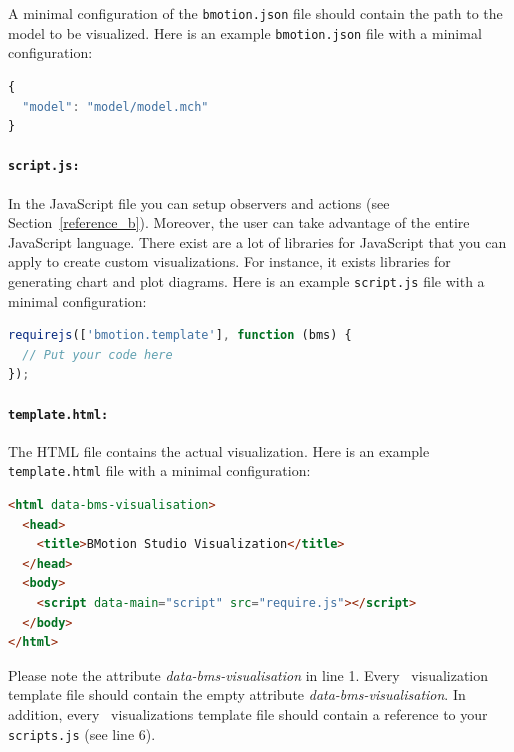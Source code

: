 A minimal configuration of the \texttt{bmotion.json} file should contain the path to the  model to be visualized.
Here is an example \texttt{bmotion.json} file with a minimal configuration:

\begin{lstlisting}[language=JavaScript]
{
  "model": "model/model.mch"
}
\end{lstlisting}


\paragraph{\texttt{script.js:}}
In the JavaScript file you can setup observers and actions (see Section~\ref{reference_b}).
Moreover, the user can take advantage of the entire JavaScript language.
There exist are a lot of libraries for JavaScript that you can apply to create custom visualizations.
For instance, it exists libraries for generating chart and plot diagrams.
Here is an example \texttt{script.js} file with a minimal configuration:

\begin{lstlisting}[language=JavaScript]
requirejs(['bmotion.template'], function (bms) {
  // Put your code here
});
\end{lstlisting}


\paragraph{\texttt{template.html:}}
The HTML file contains the actual visualization.
Here is an example \texttt{template.html} file with a minimal configuration:

\begin{lstlisting}[language=html]
<html data-bms-visualisation>
  <head>
    <title>BMotion Studio Visualization</title>
  </head>
  <body>
    <script data-main="script" src="require.js"></script>
  </body>
</html>
\end{lstlisting}

Please note the attribute \textit{data-bms-visualisation} in line 1.
Every \bms\ visualization template file should contain the empty attribute \textit{data-bms-visualisation}.
In addition, every \bms\ visualizations template file should contain a reference to your \texttt{scripts.js} (see line 6).

